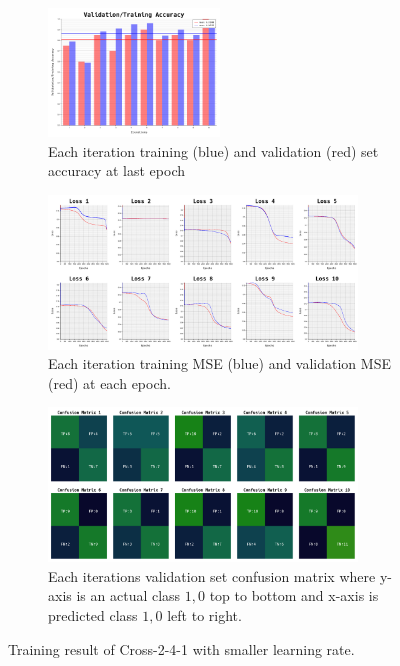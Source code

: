 \documentclass{article}
\begin{document}
\begin{figure}[ht]
	\begin{subfigure}{\textwidth}
		\centering
		\includegraphics[width=0.5\textwidth]{cross-2-4-1_3/acc}
		\caption{Each iteration training (blue) and validation (red) set accuracy at last epoch}
		\label{fig:9a}
	\end{subfigure}
	\begin{subfigure}{\textwidth}
		\centering
		\includegraphics[width=0.9\textwidth]{cross-2-4-1_3/loss}
		\caption{Each iteration training MSE (blue) and validation MSE (red) at each epoch.}
		\label{fig:9b}
	\end{subfigure}
	\begin{subfigure}{\textwidth}
		\centering
		\includegraphics[width=0.9\textwidth]{cross-2-4-1_3/confusion_matrix}
		\caption{Each iterations validation set confusion matrix where y-axis is an actual class $1, 0$ top to bottom and x-axis is predicted class $1, 0$ left to right.}
		\label{fig:9c}
	\end{subfigure}
	\caption{Training result of Cross-2-4-1 with smaller learning rate.}
	\label{fig:9}
\end{figure}
\FloatBarrier
\end{document}
